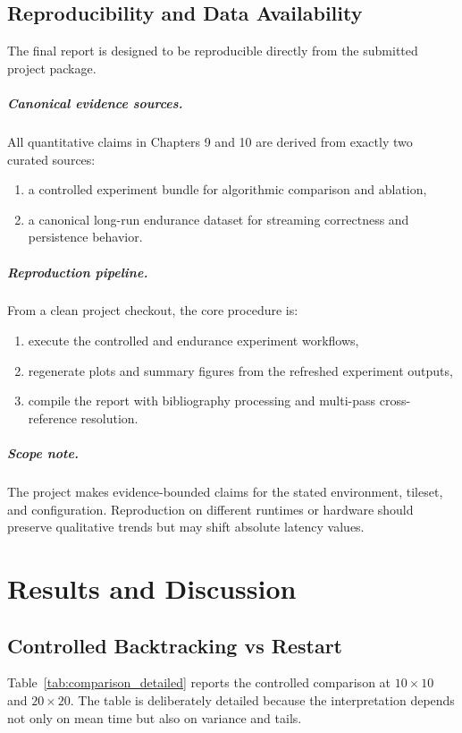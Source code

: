 \documentclass[12pt,a4paper]{report}
\begin{document}
\section{Reproducibility and Data Availability}
The final report is designed to be reproducible directly from the submitted project package.

\paragraph{Canonical evidence sources.}
All quantitative claims in Chapters 9 and 10 are derived from exactly two curated sources:
\begin{enumerate}
\item a controlled experiment bundle for algorithmic comparison and ablation,
\item a canonical long-run endurance dataset for streaming correctness and persistence behavior.
\end{enumerate}

\paragraph{Reproduction pipeline.}
From a clean project checkout, the core procedure is:
\begin{enumerate}
\item execute the controlled and endurance experiment workflows,
\item regenerate plots and summary figures from the refreshed experiment outputs,
\item compile the report with bibliography processing and multi-pass cross-reference resolution.
\end{enumerate}

\paragraph{Scope note.}
The project makes evidence-bounded claims for the stated environment, tileset, and configuration. Reproduction on different runtimes or hardware should preserve qualitative trends but may shift absolute latency values.

\chapter{Results and Discussion}
\section{Controlled Backtracking vs Restart}
Table~\ref{tab:comparison_detailed} reports the controlled comparison at $10 \times 10$ and $20 \times 20$. The table is deliberately detailed because the interpretation depends not only on mean time but also on variance and tails.
\end{document}
